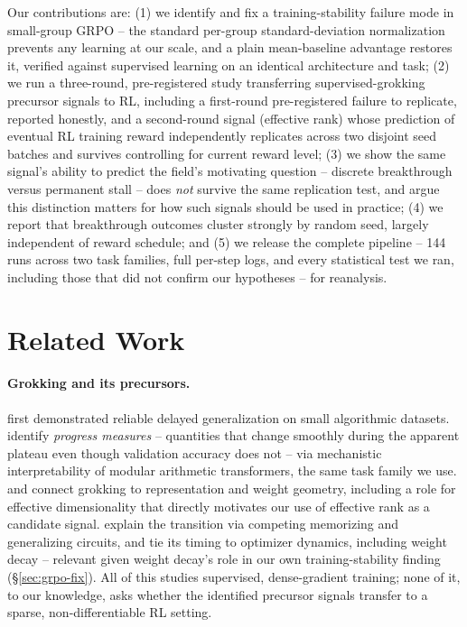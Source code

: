 \documentclass{article}
\begin{document}
Our contributions are: (1) we identify and fix a training-stability failure
mode in small-group GRPO -- the standard per-group standard-deviation
normalization prevents any learning at our scale, and a plain mean-baseline
advantage restores it, verified against supervised learning on an identical
architecture and task; (2) we run a three-round, pre-registered study
transferring supervised-grokking precursor signals to RL, including a
first-round pre-registered failure to replicate, reported honestly, and a
second-round signal (effective rank) whose prediction of eventual RL training
reward independently replicates across two disjoint seed batches and survives
controlling for current reward level; (3) we show the same signal's ability to
predict the field's motivating question -- discrete breakthrough versus
permanent stall -- does \emph{not} survive the same replication test, and
argue this distinction matters for how such signals should be used in
practice; (4) we report that breakthrough outcomes cluster strongly by random
seed, largely independent of reward schedule; and (5) we release the complete
pipeline -- 144 runs across two task families, full per-step logs, and every
statistical test we ran, including those that did not confirm our hypotheses
-- for reanalysis.

\section{Related Work}
\label{sec:related}

\paragraph{Grokking and its precursors.} \citet{power2022grokking} first
demonstrated reliable delayed generalization on small algorithmic datasets.
\citet{nanda2023progress} identify \emph{progress measures} -- quantities that
change smoothly during the apparent plateau even though validation accuracy
does not -- via mechanistic interpretability of modular arithmetic
transformers, the same task family we use. \citet{liu2022effective} and
\citet{liu2023omnigrok} connect grokking to representation and weight
geometry, including a role for effective dimensionality that directly
motivates our use of effective rank as a candidate signal.
\citet{varma2023explaining} explain the transition via competing memorizing
and generalizing circuits, and \citet{thilak2022slingshot,kumar2024grokking}
tie its timing to optimizer dynamics, including weight decay -- relevant given
weight decay's role in our own training-stability finding
(\S\ref{sec:grpo-fix}). All of this studies supervised, dense-gradient
training; none of it, to our knowledge, asks whether the identified precursor
signals transfer to a sparse, non-differentiable RL setting.
\end{document}
